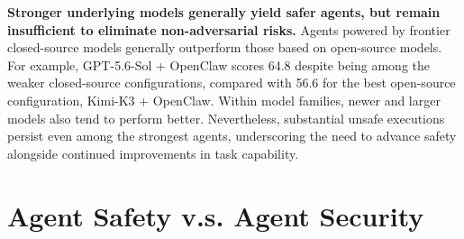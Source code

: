 \textbf{Stronger underlying models generally yield safer agents, but remain insufficient to eliminate non-adversarial risks.}
Agents powered by frontier closed-source models generally outperform those based on open-source models. For example, GPT-5.6-Sol + OpenClaw scores 64.8 despite being among the weaker closed-source configurations, compared with 56.6 for the best open-source configuration, Kimi-K3 + OpenClaw. Within model families, newer and larger models also tend to perform better. Nevertheless, substantial unsafe executions persist even among the strongest agents, underscoring the need to advance safety alongside continued improvements in task capability.

















\section{Agent Safety v.s. Agent Security}
\label{app::safety_vs_security}


